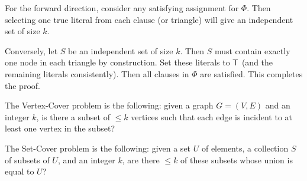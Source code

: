 \begin{pf}
    For the forward direction, consider any satisfying assignment for $\Phi$. 
    Then selecting one true literal from each clause (or triangle) will 
    give an independent set of size $k$. 

    Conversely, let $S$ be an independent set of size $k$. Then $S$ must 
    contain exactly one node in each triangle by construction. Set these 
    literals to ${\sf T}$ (and the remaining literals consistently). Then 
    all clauses in $\Phi$ are satisfied. This completes the proof. 
\end{pf}

The {\sc Vertex-Cover} problem is the following: given a graph $G = (V, E)$ 
and an integer $k$, is there a subset of $\leq k$ vertices such that 
each edge is incident to at least one vertex in the subset? 

The {\sc Set-Cover} problem is the following: given a set $U$ of elements, 
a collection $S$ of subsets of $U$, and an integer $k$, are there $\leq k$ 
of these subsets whose union is equal to $U$? 

